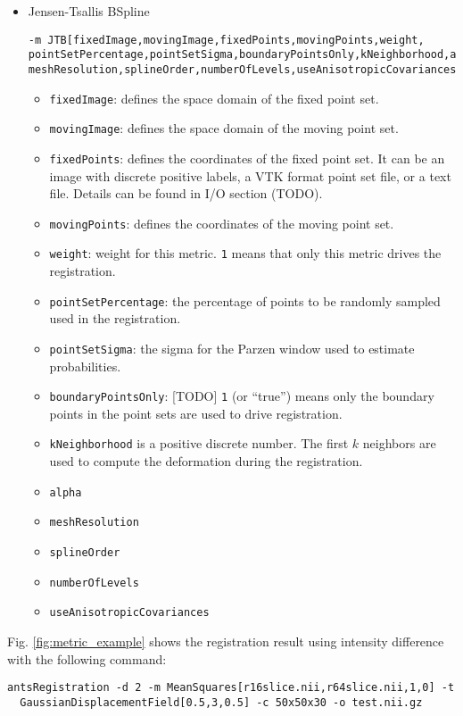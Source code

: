 \begin{itemize}
    \item Jensen-Tsallis BSpline
    \begin{verbatim}
-m JTB[fixedImage,movingImage,fixedPoints,movingPoints,weight,
pointSetPercentage,pointSetSigma,boundaryPointsOnly,kNeighborhood,alpha,
meshResolution,splineOrder,numberOfLevels,useAnisotropicCovariances] 
    \end{verbatim}
    \begin{itemize}
        \item \verb"fixedImage": defines the space domain of the fixed point set.
        \item \verb"movingImage": defines the space domain of the moving point set.
        \item \verb"fixedPoints": defines the coordinates of the fixed point set. It can be an image with discrete positive labels, a VTK format point set file, or a text file. Details can be found in I/O section (TODO).
        \item \verb"movingPoints": defines the coordinates of the moving point set.
        \item \verb"weight": weight for this metric. \verb"1" means that only this metric drives the registration.
        \item \verb"pointSetPercentage": the percentage of points to be randomly sampled used in the registration.
        \item \verb"pointSetSigma": the sigma for the Parzen window used to estimate probabilities.  
        \item \verb"boundaryPointsOnly": [TODO] \verb"1" (or ``true'') means only the boundary points in the point sets are used to drive registration.
        \item \verb"kNeighborhood" is a positive discrete number. The first $k$ neighbors are used to compute the deformation during the registration. 
        \item \verb"alpha"
        \item \verb"meshResolution"
        \item \verb"splineOrder"
        \item \verb"numberOfLevels"
        \item \verb"useAnisotropicCovariances"
    \end{itemize}

\end{itemize}


Fig. \ref{fig:metric_example} shows the registration result using intensity difference with the following command:
\begin{verbatim}
antsRegistration -d 2 -m MeanSquares[r16slice.nii,r64slice.nii,1,0] -t
  GaussianDisplacementField[0.5,3,0.5] -c 50x50x30 -o test.nii.gz
\end{verbatim}

